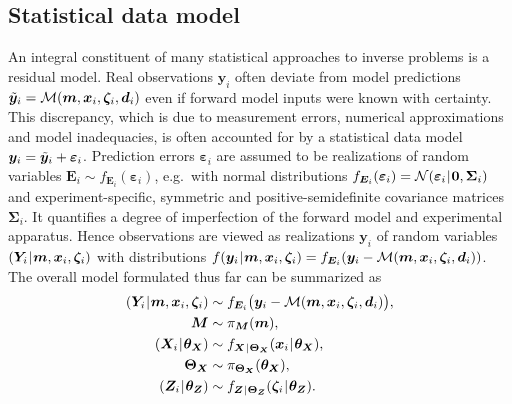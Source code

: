 \subsection{Statistical data model} \label{sec:JAIS:Multilevel:Overall}
An integral constituent of many statistical approaches to inverse problems is a residual model.
Real observations \(\bm{y}_i\) often deviate from model predictions \(\tilde{\bm{y}}_i = \mathcal{M}(\bm{m},\bm{x}_i,\bm{\zeta}_i,\bm{d}_i)\) even if forward model inputs were known with certainty.
This discrepancy, which is due to measurement errors, numerical approximations and model inadequacies, is often accounted for by a statistical data model \(\bm{y}_i = \tilde{\bm{y}}_i + \bm{\varepsilon}_i\).
Prediction errors \(\bm{\varepsilon}_i\) are assumed to be realizations of random variables \(\bm{E}_i \sim f_{\bm{E}_i}(\bm{\varepsilon}_i)\), e.g.\ with normal distributions
\(f_{\bm{E}_i}(\bm{\varepsilon}_i) = \mathcal{N}(\bm{\varepsilon}_i {\:\!}|{\:\!} \bm{0},\bm{\Sigma}_i)\) and experiment-specific, symmetric and positive-semidefinite covariance matrices \(\bm{\Sigma}_i\).
It quantifies a degree of imperfection of the forward model and experimental apparatus.
Hence observations are viewed as realizations \(\bm{y}_i\) of random variables \((\bm{Y}_i {\:\!}|{\:\!} \bm{m},\bm{x}_i,\bm{\zeta}_i)\)
with distributions \(f (\bm{y}_i {\:\!}|{\:\!} \bm{m},\bm{x}_i,\bm{\zeta}_i) = f_{\bm{E}_i}(\bm{y}_i-\mathcal{M}(\bm{m},\bm{x}_i,\bm{\zeta}_i,\bm{d}_i))\).
The overall model formulated thus far can be summarized as
\begin{subequations} \label{eq:JAIS:Multilevel:Model}
  \begin{align}
    (\bm{Y}_i \cond \bm{m},\bm{x}_i,\bm{\zeta}_i) &\sim f_{\bm{E}_i} \big( \bm{y}_i-\mathcal{M}(\bm{m},\bm{x}_i,\bm{\zeta}_i,\bm{d}_i) \big), \label{eq:JAIS:Multilevel:Model:Data} \\
    \bm{M} &\sim \pi_{\bm{M}} (\bm{m}), \label{eq:JAIS:Multilevel:Model:PriorM} \\
    (\bm{X}_i \cond \bm{\theta}_{\bm{X}}) &\sim f_{\bm{X} \cond \bm{\Theta}_{\bm{X}}} (\bm{x}_i \cond \bm{\theta}_{\bm{X}}), \label{eq:JAIS:Multilevel:Model:PopulationX} \\
    \bm{\Theta}_{\bm{X}} &\sim \pi_{\bm{\Theta}_{\bm{X}}} (\bm{\theta}_{\bm{X}}), \label{eq:JAIS:Multilevel:Model:PriorThetaX} \\
    (\bm{Z}_i \cond \bm{\theta}_{\bm{Z}}) &\sim f_{\bm{Z} \cond \bm{\Theta}_{\bm{Z}}}(\bm{\zeta}_i \cond \bm{\theta}_{\bm{Z}}). \label{eq:JAIS:Multilevel:Model:PopulationZ}
  \end{align}
\end{subequations}
